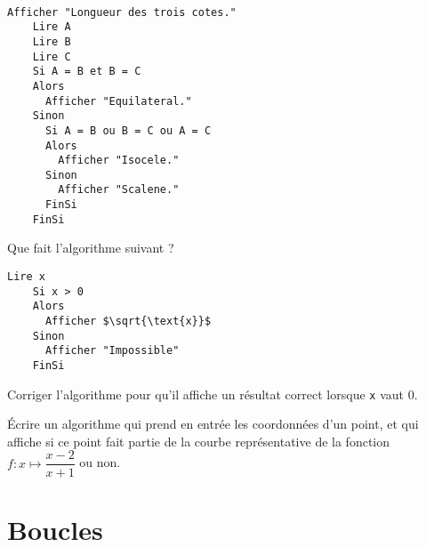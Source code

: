 \begin{multicols}{2}
\begin{exemple}~

  \begin{lstlisting}[language=naturel,frame=lines,mathescape=true]
    Afficher "Longueur des trois cotes."
    Lire A
    Lire B
    Lire C
    Si A = B et B = C
    Alors
      Afficher "Equilateral."
    Sinon
      Si A = B ou B = C ou A = C
      Alors
        Afficher "Isocele."
      Sinon
        Afficher "Scalene."
      FinSi
    FinSi
  \end{lstlisting}
\end{exemple}

\columnbreak

\begin{exercice}Que fait l'algorithme suivant ?
  \begin{lstlisting}[language=naturel,frame=lines,mathescape=true]
    Lire x
    Si x > 0
    Alors
      Afficher $\sqrt{\text{x}}$
    Sinon
      Afficher "Impossible"
    FinSi
  \end{lstlisting}

  Corriger l'algorithme pour qu'il affiche un résultat correct lorsque
  \texttt{x} vaut 0.
\end{exercice}

\begin{exercice}
  Écrire un algorithme qui prend en entrée les coordonnées d'un point, et qui
  affiche si ce point fait partie de la courbe représentative de la fonction
  $f:x\mapsto\dfrac{x-2}{x+1}$ ou non.
\end{exercice}
\end{multicols}

\section{Boucles}


